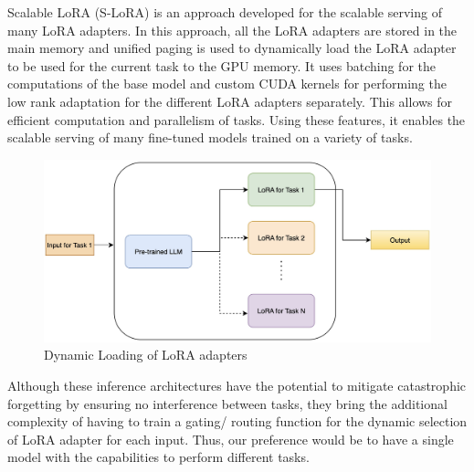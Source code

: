 Scalable LoRA (S-LoRA) \cite{sheng2023s} is an approach developed for the scalable serving of many LoRA adapters. In this approach, all the LoRA adapters are stored in the main memory and unified paging is used to dynamically load the LoRA adapter to be used for the current task to the GPU memory. It uses batching for the computations of the base model and custom CUDA kernels for performing the low rank adaptation for the different LoRA adapters separately. This allows for efficient computation and parallelism of tasks. Using these features, it enables the scalable serving of many fine-tuned models trained on a variety of tasks.
\begin{figure}[h]
    \centering
    \includegraphics[width=1\textwidth]{Figures/literature_review/dynamic_loading.jpeg} 
    \caption{Dynamic Loading of LoRA adapters}
    \label{fig:SLoRA}
\end{figure}

Although these inference architectures have the potential to mitigate catastrophic forgetting by ensuring no interference between tasks, they bring the additional complexity of having to train a gating/ routing function for the dynamic selection of LoRA adapter for each input. Thus, our preference would be to have a single model with the capabilities to perform different tasks.

